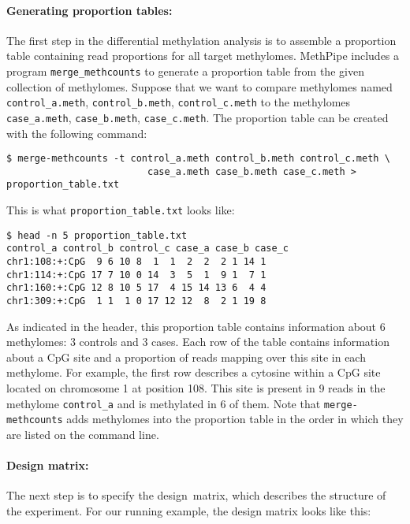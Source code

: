 \documentclass[10pt]{article}
\newcommand{\prog}[1]{\texttt{#1}}
\begin{document}
\paragraph{Generating proportion tables:} The first step in the differential
methylation analysis is to assemble a proportion table containing read
proportions for all target methylomes. MethPipe includes a program
\prog{merge\_methcounts} to generate a proportion table from the given collection of
methylomes. Suppose that we want to compare methylomes named
{\tt control\_a.meth}, {\tt control\_b.meth}, {\tt control\_c.meth}
to the methylomes {\tt case\_a.meth}, {\tt case\_b.meth},
{\tt case\_c.meth}. The proportion table can be created with the following
command:

{\small{%
\begin{verbatim}
$ merge-methcounts -t control_a.meth control_b.meth control_c.meth \
                         case_a.meth case_b.meth case_c.meth > proportion_table.txt
\end{verbatim}%
}}

This is what {\tt proportion\_table.txt} looks like:

{\small{%
\begin{verbatim}
$ head -n 5 proportion_table.txt
control_a control_b control_c case_a case_b case_c
chr1:108:+:CpG  9 6 10 8  1  1  2  2  2 1 14 1
chr1:114:+:CpG 17 7 10 0 14  3  5  1  9 1  7 1
chr1:160:+:CpG 12 8 10 5 17  4 15 14 13 6  4 4
chr1:309:+:CpG  1 1  1 0 17 12 12  8  2 1 19 8
\end{verbatim}%
}}

As indicated in the header, this proportion table contains information about 6
methylomes: 3 controls and 3 cases. Each row of the table contains information
about a CpG site and a proportion of reads mapping over this site in each
methylome. For example, the first row describes a cytosine within a CpG site
located on chromosome 1 at position 108. This site is present in 9 reads in the
methylome {\tt control\_a} and is methylated in 6 of them. Note that
\prog{merge-methcounts} adds methylomes into the proportion table in the order
in which they are listed on the command line.

\paragraph{Design matrix:} The next step is to specify the design\ matrix, which
describes the structure of the experiment. For our running example, the design
matrix looks like this:
\end{document}
